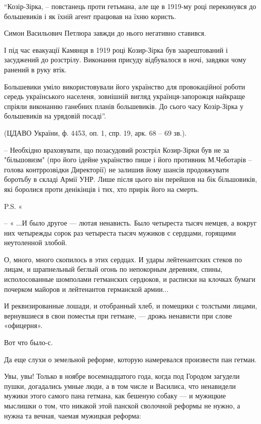 “Козір-Зірка, – повстанець проти гетьмана, але ще в 1919-му році перекинувся до
большевиків і як їхній агент працював на їхню користь. 

Симон Васильович Петлюра завжди до нього негативно ставився. 

І під час евакуації Камянця в 1919 році Козир-Зірка був заарештований і
засуджений до розстрілу. Виконання присуду відбувалося в ночі, завдяки чому
ранений в руку втік.

Большевики уміло використовували його українство для провокаційної роботи
середь українського населеня, зовнішній вигляд українця-запорожця найкраще
спріяли виконанню ганебних планів большевиків. До сього часу Козір-Зірка у
большевиків на урядовій посаді”.

 (ЦДАВО України, ф. 4453, оп. 1, спр. 19, арк. 68 – 69 зв.).

\zzrule

– Необхідно враховувати, що позасудовий розстріл Козир-Зірки був не за
"більшовизм" (про його ідейне українство пише і його противник М.Чеботарів
– голова контррозвідки Директорії) не залишив йому шансів продовжувати
боротьбу в складі Армії УНР. Лише після цього він перейшов на бік
більшовиків, які боролися проти денікінців і тих, хто прирік його на
смерть. 

P.S. «

– « ...И было другое — лютая ненависть. Было четыреста тысяч немцев, а вокруг них
четырежды сорок раз четыреста тысяч мужиков с сердцами, горящими неутоленной
злобой. 

О, много, много скопилось в этих сердцах. И удары лейтенантских стеков по
лицам, и шрапнельный беглый огонь по непокорным деревням, спины,
исполосованные шомполами гетманских сердюков, и расписки на клочках бумаги
почерком майоров и лейтенантов германской армии...

И реквизированные лошади, и отобранный хлеб, и помещики с толстыми лицами,
вернувшиеся в свои поместья при гетмане, — дрожь ненависти при слове
«офицерня».

Вот что было-с.

Да еще слухи о земельной реформе, которую намеревался произвести пан гетман.

Увы, увы! Только в ноябре восемнадцатого года, когда под Городом загудели
пушки, догадались умные люди, а в том числе и Василиса, что ненавидели мужики
этого самого пана гетмана, как бешеную собаку — и мужицкие мыслишки о том, что
никакой этой панской сволочной реформы не нужно, а нужна та вечная, чаемая
мужицкая реформа:

